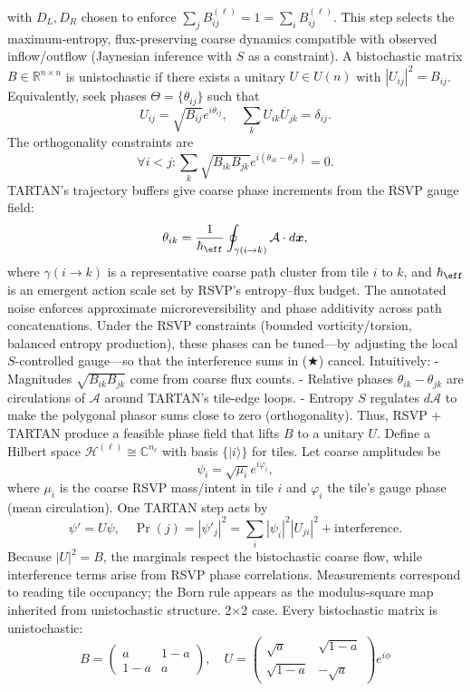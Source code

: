 \documentclass[11pt]{article}
\theoremstyle{plain}
\theoremstyle{definition}
\begin{document}
with $D_L, D_R$ chosen to enforce $\sum_j B_{ij}^{(\ell)} = 1 = \sum_i B_{ij}^{(\ell)}$. This step selects the maximum-entropy, flux-preserving coarse dynamics compatible with observed inflow/outflow (Jaynesian inference with $S$ as a constraint).
A bistochastic matrix $B \in \mathbb{R}^{n \times n}$ is unistochastic if there exists a unitary $U \in U(n)$ with $|U_{ij}|^2 = B_{ij}$. Equivalently, seek phases $\Theta = \{\theta_{ij}\}$ such that
\[
U_{ij} = \sqrt{B_{ij}} e^{i \theta_{ij}}, \quad \sum_k U_{ik} \overline{U}_{jk} = \delta_{ij}.
\]
The orthogonality constraints are
\[
\forall i < j: \sum_k \sqrt{B_{ik} B_{jk}} e^{i (\theta_{ik} - \theta_{jk})} = 0. \tag{★}
\]
TARTAN’s trajectory buffers give coarse phase increments from the RSVP gauge field:
\[
\theta_{ik} = \frac{1}{\hbar_{\eff}} \oint_{\gamma(i \to k)} \mathcal{A} \cdot d\bm{x},
\]
where $\gamma(i \to k)$ is a representative coarse path cluster from tile $i$ to $k$, and $\hbar_{\eff}$ is an emergent action scale set by RSVP’s entropy–flux budget. The annotated noise enforces approximate microreversibility and phase additivity across path concatenations. Under the RSVP constraints (bounded vorticity/torsion, balanced entropy production), these phases can be tuned—by adjusting the local $S$-controlled gauge—so that the interference sums in (★) cancel. Intuitively:
- Magnitudes $\sqrt{B_{ik} B_{jk}}$ come from coarse flux counts.
- Relative phases $\theta_{ik} - \theta_{jk}$ are circulations of $\mathcal{A}$ around TARTAN’s tile-edge loops.
- Entropy $S$ regulates $d\mathcal{A}$ to make the polygonal phasor sums close to zero (orthogonality).
Thus, RSVP + TARTAN produce a feasible phase field that lifts $B$ to a unitary $U$.
Define a Hilbert space $\mathcal{H}^{(\ell)} \cong \mathbb{C}^{n_\ell}$ with basis $\{|i\rangle\}$ for tiles. Let coarse amplitudes be
\[
\psi_i = \sqrt{\mu_i} e^{i \varphi_i},
\]
where $\mu_i$ is the coarse RSVP mass/intent in tile $i$ and $\varphi_i$ the tile’s gauge phase (mean circulation). One TARTAN step acts by
\[
\psi' = U \psi, \quad \Pr(j) = |\psi'_j|^2 = \sum_i |\psi_i|^2 |U_{ji}|^2 + \text{interference}.
\]
Because $|U|^2 = B$, the marginals respect the bistochastic coarse flow, while interference terms arise from RSVP phase correlations. Measurements correspond to reading tile occupancy; the Born rule appears as the modulus-square map inherited from unistochastic structure.
2×2 case. Every bistochastic matrix is unistochastic:
\[
B = \begin{pmatrix} a & 1-a \\ 1-a & a \end{pmatrix}, \quad U = \begin{pmatrix} \sqrt{a} & \sqrt{1-a} \\ \sqrt{1-a} & -\sqrt{a} \end{pmatrix} e^{i\phi}
\]
\end{document}
